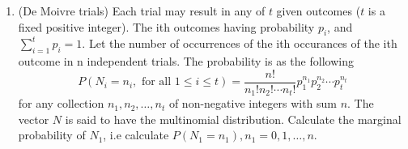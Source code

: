 \documentclass[12pt]{article}
\begin{document}
\begin{enumerate}
\item
(De Moivre trials) Each trial may result in any of \(t\) given outcomes (\(t\) is a fixed positive integer). The ith outcomes having probability \(p_i\), and \(\sum_{i=1}^{t} p_i  = 1\).
Let the number of occurrences of the ith occurances of the ith outcome in n independent trials. The probability is as the following
\[
    P(N_i = n_i, \text{ for all } 1 \leq i \leq t) = \frac{n!}{n_1!n_2!\cdots n_t!}p_1^{n_1}p_2^{n_2} \cdots p_t^{n_t}
\]
for any collection \(n_1, n_2, \dots, n_t\) of non-negative integers with sum \(n\). The vector \(N\) is said to have the multinomial distribution.
Calculate the marginal probability of \(N_1\), i.e calculate \(P(N_1 = n_1), n_1 = 0,1,\dots,n\).



\end{enumerate}
\end{document}
